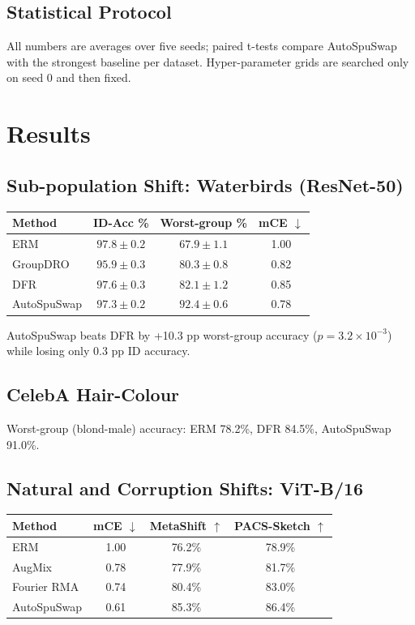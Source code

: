 \documentclass{article}
\begin{document}
\subsection{Statistical Protocol}
All numbers are averages over five seeds; paired t-tests compare AutoSpuSwap with the strongest baseline per dataset. Hyper-parameter grids are searched only on seed 0 and then fixed.

\section{Results}
\subsection{Sub-population Shift: Waterbirds (ResNet-50)}
\begin{tabularx}{\textwidth}{Y c c c}
\hline
Method & ID-Acc \% & Worst-group \% & mCE $\downarrow$ \\
\hline
ERM & $97.8 \pm 0.2$ & $67.9 \pm 1.1$ & 1.00 \\
GroupDRO & $95.9 \pm 0.3$ & $80.3 \pm 0.8$ & 0.82 \\
DFR & $97.6 \pm 0.3$ & $82.1 \pm 1.2$ & 0.85 \\
AutoSpuSwap & $97.3 \pm 0.2$ & $92.4 \pm 0.6$ & 0.78 \\
\hline
\end{tabularx}

AutoSpuSwap beats DFR by +10.3 pp worst-group accuracy (\(p = 3.2\times10^{-3}\)) while losing only 0.3 pp ID accuracy.

\subsection{CelebA Hair-Colour}
Worst-group (blond-male) accuracy: ERM 78.2\%, DFR 84.5\%, AutoSpuSwap 91.0\%.

\subsection{Natural and Corruption Shifts: ViT-B/16}
\begin{tabularx}{\textwidth}{Y c c c}
\hline
Method & mCE $\downarrow$ & MetaShift $\uparrow$ & PACS-Sketch $\uparrow$ \\
\hline
ERM & 1.00 & 76.2\% & 78.9\% \\
AugMix & 0.78 & 77.9\% & 81.7\% \\
Fourier RMA & 0.74 & 80.4\% & 83.0\% \\
AutoSpuSwap & 0.61 & 85.3\% & 86.4\% \\
\hline
\end{tabularx}
\end{document}
